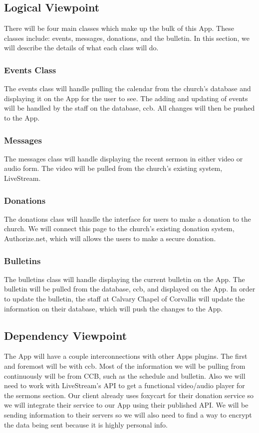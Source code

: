 \documentclass[letterpaper,10pt,draftclsnofoot,onecolumn,titlepage]{IEEEtran}
\begin{document}
		\subsection{Logical Viewpoint}
			There will be four main classes which make up the bulk of this \gls{App}.
			These classes include: events, messages, donations, and the bulletin.
			In this section, we will describe the details of what each class will do.

			\subsubsection{Events Class}
				The events class will handle pulling the calendar from the church's database and displaying it on the \gls{App} for the user to see.
				The adding and updating of events will be handled by the staff on the database, \gls{ccb}.
				All changes will then be pushed to the \gls{App}.

			\subsubsection{Messages}
				The messages class will handle displaying the recent sermon in either video or audio form.
				The video will be pulled from the church's existing system, LiveStream.

			\subsubsection{Donations}
				The donations class will handle the interface for users to make a donation to the church.
				We will connect this page to the church's existing donation system, Authorize.net, which will allows the users to make a secure donation.

			\subsubsection{Bulletins}
				The bulletins class will handle displaying the current bulletin on the \gls{App}.
				The bulletin will be pulled from the database, \gls{ccb}, and displayed on the \gls{App}.
				In order to update the bulletin, the staff at Calvary Chapel of Corvallis will update the information on their database, which will push the changes to the \gls{App}.

		\subsection{Dependency Viewpoint}
			The \gls{App} will have a couple interconnections with other \glspl{App} plugins.
			The first and foremost will be with \gls{ccb}.
			Most of the information we will be pulling from continuously will be from CCB, such as the schedule and bulletin.
			Also we will need to work with LiveStream's API to get a functional video/audio player for the sermons section.
			Our client already uses foxycart for their donation service so we will integrate their service to our \gls{App} using their published API.
			We will be sending information to their servers so we will also need to find a way to encrypt the data being sent because it is highly personal info.
\end{document}

